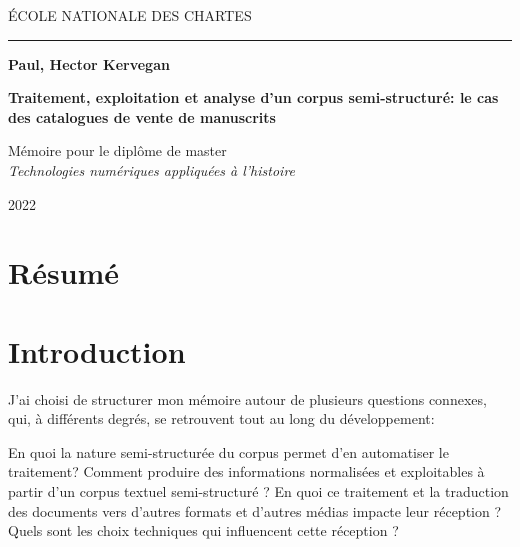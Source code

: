\documentclass[a4paper, 12pt, twoside]{book}
\begin{document}
	\onehalfspacing
	
	\begin{titlepage}
		\begin{center}		
			\bigskip
			
			\begin{large}
				ÉCOLE NATIONALE DES CHARTES\\
			\end{large}
			
			\rule{2cm}{0.02cm}
			
			\begin{Large}
				\textbf{Paul, Hector Kervegan}\\
			\end{Large}
			
			\vfill
			
			\begin{Huge}
				\textbf{Traitement, exploitation et analyse d'un corpus semi-structuré: le cas des catalogues de vente de manuscrits}
			\end{Huge}
			
			\vfill
			
			\begin{large}
				Mémoire pour le diplôme de master \\
				\emph{Technologies numériques appliquées à l'histoire}
				
				\bigskip
				
				2022
			\end{large}
			
		\end{center}
	\end{titlepage}

\frontmatter
\chapter*{Résumé}


\mainmatter
\chapter*{Introduction}
J'ai choisi de structurer mon mémoire autour de plusieurs questions connexes, qui, à différents degrés, se retrouvent tout au long du développement:

En quoi la nature semi-structurée du corpus permet d'en automatiser le traitement? Comment produire des informations normalisées et exploitables à partir d'un corpus textuel semi-structuré ? En quoi ce traitement et la traduction des documents vers d'autres formats et d'autres médias impacte leur réception ? Quels sont les choix techniques qui influencent cette réception ?
\end{document}
